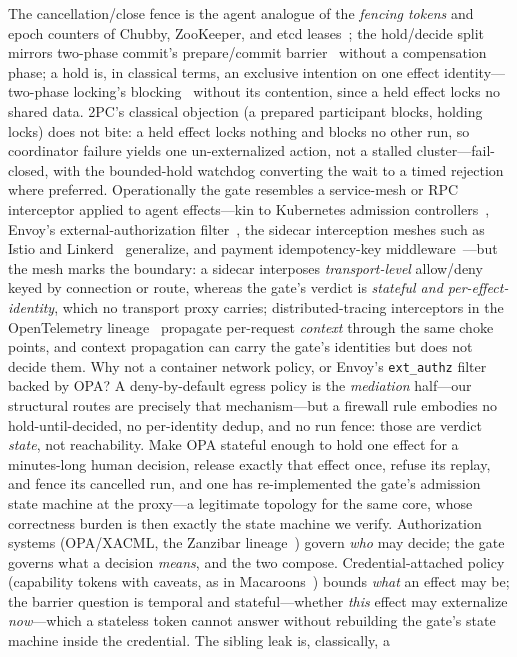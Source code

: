 \documentclass[10pt,journal,compsoc]{IEEEtran}
\begin{document}
The cancellation/close fence is the agent analogue of the \emph{fencing tokens}
and epoch counters of Chubby, ZooKeeper, and etcd
leases~\cite{burrows06,fencing-kleppmann}; the hold/decide split mirrors
two-phase commit's prepare/commit barrier~\cite{2pc-gray} without a
compensation phase; a hold is, in classical terms, an exclusive intention on
one effect identity---two-phase locking's blocking~\cite{eswaran76} without its
contention, since a held effect locks no shared data. 2PC's classical objection (a prepared participant blocks, holding locks) does not bite: a held effect locks nothing and blocks no other run, so coordinator failure yields one un-externalized action, not a stalled cluster---fail-closed, with the bounded-hold watchdog converting the wait to a timed rejection where preferred. Operationally the gate resembles a service-mesh or
RPC interceptor applied to agent effects---kin to Kubernetes admission
controllers~\cite{k8s-admission}, Envoy's external-authorization
filter~\cite{envoy-extauthz}, the sidecar interception meshes such as Istio and
Linkerd~\cite{linkerd} generalize, and payment idempotency-key
middleware~\cite{stripe-idem}---but the mesh marks the boundary: a sidecar
interposes \emph{transport-level} allow/deny keyed by connection or route,
whereas the gate's verdict is \emph{stateful and per-effect-identity}, which no
transport proxy carries; distributed-tracing interceptors in the
OpenTelemetry lineage~\cite{otel} propagate per-request \emph{context}
through the same choke points, and context propagation can carry the gate's
identities but does not decide them. Why not a container network policy, or Envoy's \texttt{ext\_authz} filter backed by OPA? A deny-by-default egress policy is the \emph{mediation} half---our structural routes are precisely that mechanism---but a firewall rule embodies no hold-until-decided, no per-identity dedup, and no run fence: those are verdict \emph{state}, not reachability. Make OPA stateful enough to hold one effect for a minutes-long human decision, release exactly that effect once, refuse its replay, and fence its cancelled run, and one has re-implemented the gate's admission state machine at the proxy---a legitimate topology for the same core, whose correctness burden is then exactly the state machine we verify. Authorization systems (OPA/XACML, the Zanzibar
lineage~\cite{zanzibar19}) govern \emph{who} may decide; the gate governs what
a decision \emph{means}, and the two compose. Credential-attached policy (capability tokens with caveats, as in Macaroons~\cite{macaroons14}) bounds \emph{what} an effect may be; the barrier question is temporal and stateful---whether \emph{this} effect may externalize \emph{now}---which a stateless token cannot answer without rebuilding the gate's state machine inside the credential. The sibling leak is, classically, a
\end{document}
